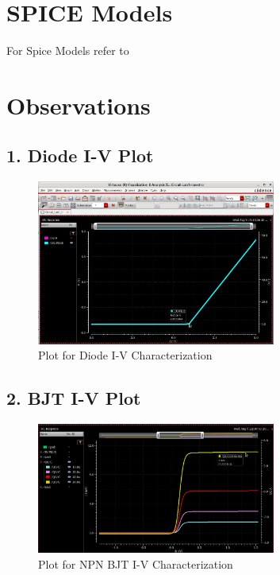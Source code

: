 \documentclass[12pt,a4paper]{article}
\begin{document}
\section*{SPICE Models}
For Spice Models refer to\\
\url{}

\section*{Observations}
\subsection*{1. Diode I-V Plot}
\begin{figure}[H]
    \centering
    \includegraphics[width=0.7\textwidth]{figs/Diode/Plot.jpg} %
    \caption{Plot for Diode I-V Characterization}
\end{figure}

\subsection*{2. BJT I-V Plot}
\begin{figure}[H]
    \centering
    \includegraphics[width=0.7\textwidth]{figs/BJT/NPN/Plot.jpg} %
    \caption{Plot for NPN BJT I-V Characterization}
\end{figure}
\end{document}
